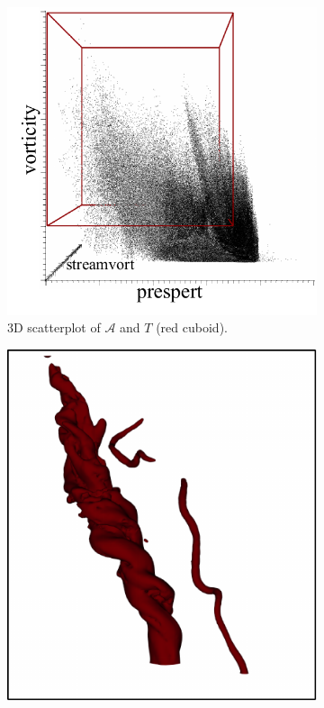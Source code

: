 \begin{figure}[!h]
\begin{subfigure}{0.17\linewidth}
\centering
\includegraphics[width=\linewidth]{Images/Tornado/scatterplot3d.pdf}
\vspace{-4mm}
\caption{3D scatterplot of $\mathcal{A}$ and $T$ (red cuboid).} 
\label{fig:tornado_scatterplot}
\end{subfigure}
\hfill
\begin{subfigure}{0.20\linewidth}
\centering
\includegraphics[width=0.9\linewidth]{Images/Tornado/zls.pdf}

\end{subfigure}
\end{figure}
